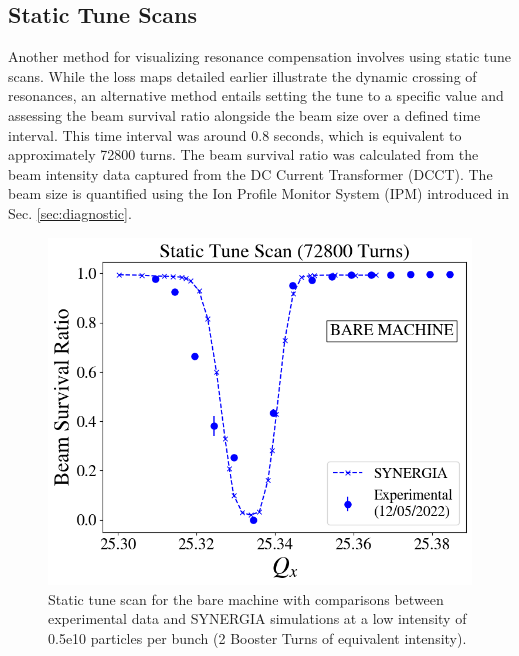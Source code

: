 \subsection{\label{sec:static_low}Static Tune Scans}

Another method for visualizing resonance compensation involves using static tune scans. While the loss maps detailed earlier illustrate the dynamic crossing of resonances, an alternative method entails setting the tune to a specific value and assessing the beam survival ratio alongside the beam size over a defined time interval. This time interval was around 0.8 seconds, which is equivalent to approximately 72800 turns. The beam survival ratio was calculated from the beam intensity data captured from the DC Current Transformer (DCCT). The beam size is quantified using the Ion Profile Monitor System (IPM) introduced in Sec. \ref{sec:diagnostic}.

\begin{figure}[H]
    \centering
    \includegraphics[width=\columnwidth]{chapter4/static2turns.png}
    \caption{Static tune scan for the bare machine with comparisons between experimental data and SYNERGIA simulations at a low intensity of 0.5e10 particles per bunch (2 Booster Turns of equivalent intensity).}
    \label{fig:static2}
\end{figure}

